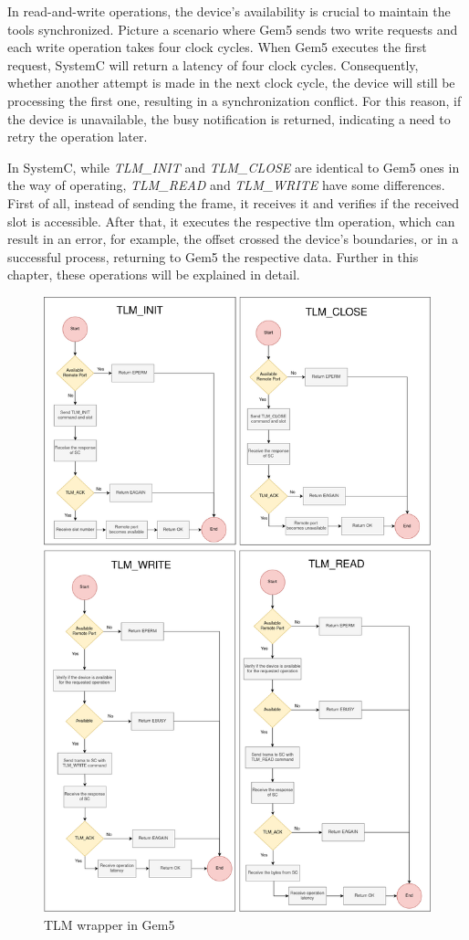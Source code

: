 In read-and-write operations, the device's availability is crucial to maintain the tools synchronized. Picture a scenario where Gem5 sends 
two write requests and each write operation takes four clock cycles. When Gem5 executes the first request, SystemC will return a latency of 
four clock cycles. Consequently, whether another attempt is made in the next clock cycle, the device will still be processing the first one, 
resulting in a synchronization conflict. For this reason, if the device is unavailable, the busy notification is returned, indicating a need to 
retry the operation later.

In SystemC, while \textit{TLM\_INIT} \space and \textit{TLM\_CLOSE} \space are identical to Gem5 ones in the way of operating, 
\textit{TLM\_READ} \space and \textit{TLM\_WRITE} \space have some differences. First of all, instead of sending the frame, it receives 
it and verifies if the received slot is accessible.
After that, it executes the respective \gls{tlm} operation, which can result in an error, for example, 
the offset crossed the device's boundaries, or in a successful process, returning to Gem5 the respective data. Further in this chapter, these 
operations will be explained in detail. 


\begin{figure}[H]
	\centering
 	\includegraphics[width=0.8\linewidth]{Images/TLMWrapper_Gem5.png} 
 	\caption{TLM wrapper in Gem5}
\end{figure}

